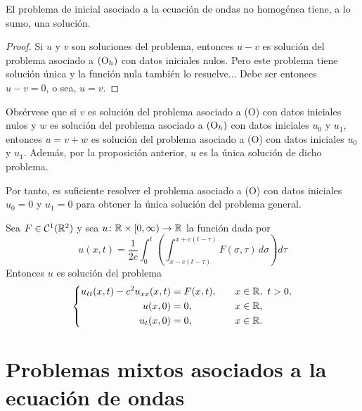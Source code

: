 \documentclass[a4paper, 12pt, extrafontsizes]{memoir}
\begin{document}
\begin{proposition}
    El problema de inicial asociado a la ecuación de ondas no homogénea tiene, a lo sumo, una solución.
\end{proposition}

\begin{proof}
    Si $u$ y $v$ son soluciones del problema, entonces $u-v$ es solución del problema asociado a $(\textup{O}_h)$ con datos iniciales nulos. Pero este problema tiene solución única y la función nula también lo resuelve... Debe ser entonces $u-v= 0$, o sea, $u= v$.
\end{proof}

Obsérvese que si $v$ es solución del problema asociado a (O) con datos iniciales nulos y $w$ es solución del problema asociado a $(\textup{O}_h)$ con datos iniciales $u_0$ y $u_1$, entonces $u=v+w$ es solución del problema asociado a (O) con datos iniciales $u_0$ y $u_1$. Además, por la proposición anterior, $u$ es la única solución de dicho problema.

Por tanto, es suficiente resolver el problema asociado a (O) con datos iniciales $u_0 = 0$ y $u_1 = 0$ para obtener la única solución del problema general.

\begin{theorem}
    Sea $F \in \mathcal{C}^1(\mathbb R^2)$ y sea $u \colon \mathbb R \times [0,\infty) \to \mathbb R$ la función dada por
    \[u(x,t)=\frac{1}{2c}\int_0^t\left( \int_{x-c(t-\tau)}^{x+c(t-\tau)}F(\sigma,\tau) \, d\sigma\right) d\tau\]
    Entonces $u$ es solución del problema
    \[
    \left\{\begin{alignedat}{3}
        u_{tt}(x,t)-c^2u_{xx}(x,t) &= F(x,t), \qquad & x &\in \mathbb R, \ t > 0, \\
        u(x,0) &= 0, \qquad & x &\in \mathbb R, \\
        u_t(x,0) &= 0, \qquad & x &\in \mathbb R.
    \end{alignedat}\right.
    \]
\end{theorem}

\section{Problemas mixtos asociados a la ecuación de ondas}
\end{document}
